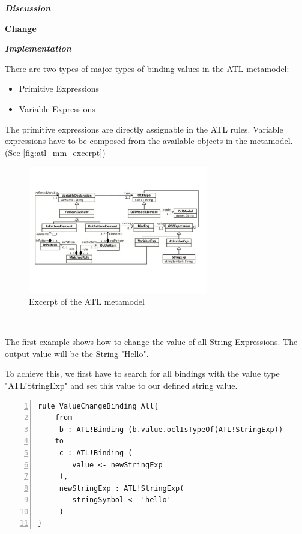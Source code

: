 \documentclass{llncs}
\begin{document}
\textbf\textit{{Discussion}}

\textbf{Change}

\textbf\textit{{Implementation}}

There are two types of major types of binding values in the ATL metamodel:

\begin{itemize}
	\item Primitive Expressions
	\item Variable Expressions
\end{itemize}

The primitive expressions are directly assignable in the ATL rules. Variable expressions have to be composed from the available objects in the metamodel. (See \ref{fig:atl_mm_excerpt})

\begin{figure}
	\centering
	\includegraphics[width=0.7\textwidth,natwidth=610,natheight=642]{figures/ATL_Metamodel_Excerpt}
	\caption{Excerpt of the ATL metamodel}
	\label{fig:atl_metamodel_excerpt}
\end{figure}~

The first example shows how to change the value of all String Expressions. The output value will be the String "Hello".

To achieve this, we first have to search for all bindings with the value type "ATL!StringExp" and set this value to our defined string value.

\begin{lstlisting}[language=ATL, numbers=left,xleftmargin=5.0ex, caption=ValueChangeBinding-Definition., label=lst:valuechangebinding]
rule ValueChangeBinding_All{
	from
	 b : ATL!Binding (b.value.oclIsTypeOf(ATL!StringExp))
	to
	 c : ATL!Binding (
	 	value <- newStringExp
	 ),
	 newStringExp : ATL!StringExp(
	 	stringSymbol <- 'hello'	
	 )
}
\end{lstlisting}
\end{document}
